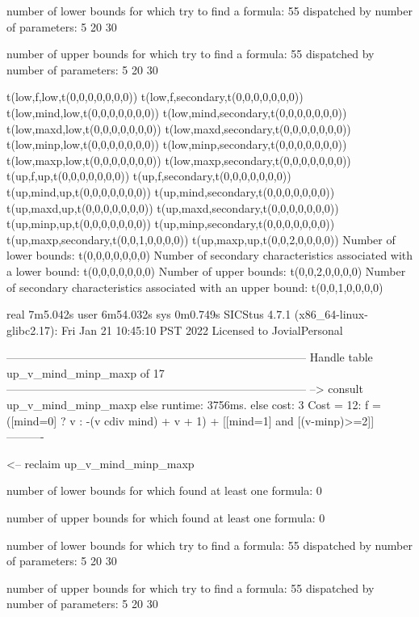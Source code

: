 number of lower bounds for which try to find a formula: 55
dispatched by number of parameters: 5  20  30

number of upper bounds for which try to find a formula: 55
dispatched by number of parameters: 5  20  30

t(low,f,low,t(0,0,0,0,0,0,0))
t(low,f,secondary,t(0,0,0,0,0,0,0))
t(low,mind,low,t(0,0,0,0,0,0,0))
t(low,mind,secondary,t(0,0,0,0,0,0,0))
t(low,maxd,low,t(0,0,0,0,0,0,0))
t(low,maxd,secondary,t(0,0,0,0,0,0,0))
t(low,minp,low,t(0,0,0,0,0,0,0))
t(low,minp,secondary,t(0,0,0,0,0,0,0))
t(low,maxp,low,t(0,0,0,0,0,0,0))
t(low,maxp,secondary,t(0,0,0,0,0,0,0))
t(up,f,up,t(0,0,0,0,0,0,0))
t(up,f,secondary,t(0,0,0,0,0,0,0))
t(up,mind,up,t(0,0,0,0,0,0,0))
t(up,mind,secondary,t(0,0,0,0,0,0,0))
t(up,maxd,up,t(0,0,0,0,0,0,0))
t(up,maxd,secondary,t(0,0,0,0,0,0,0))
t(up,minp,up,t(0,0,0,0,0,0,0))
t(up,minp,secondary,t(0,0,0,0,0,0,0))
t(up,maxp,secondary,t(0,0,1,0,0,0,0))
t(up,maxp,up,t(0,0,2,0,0,0,0))
Number of lower bounds:                                             t(0,0,0,0,0,0,0)
Number of secondary characteristics associated with a lower bound:  t(0,0,0,0,0,0,0)
Number of upper bounds:                                             t(0,0,2,0,0,0,0)
Number of secondary characteristics associated with an upper bound: t(0,0,1,0,0,0,0)

real	7m5.042s
user	6m54.032s
sys	0m0.749s
SICStus 4.7.1 (x86_64-linux-glibc2.17): Fri Jan 21 10:45:10 PST 2022
Licensed to JovialPersonal


--------------------------------------------------------------------------------
Handle table up_v_mind_minp_maxp of 17
--------------------------------------------------------------------------------
--> consult up_v_mind_minp_maxp
else runtime: 3756ms. else cost: 3
Cost = 12:  f = ([mind=0] ? v : -(v cdiv mind) + v + 1) + [[mind=1] and [(v-minp)>=2]] %
----------

<-- reclaim up_v_mind_minp_maxp

number of lower bounds for which found at least one formula: 0

number of upper bounds for which found at least one formula: 0

number of lower bounds for which try to find a formula: 55
dispatched by number of parameters: 5  20  30

number of upper bounds for which try to find a formula: 55
dispatched by number of parameters: 5  20  30

